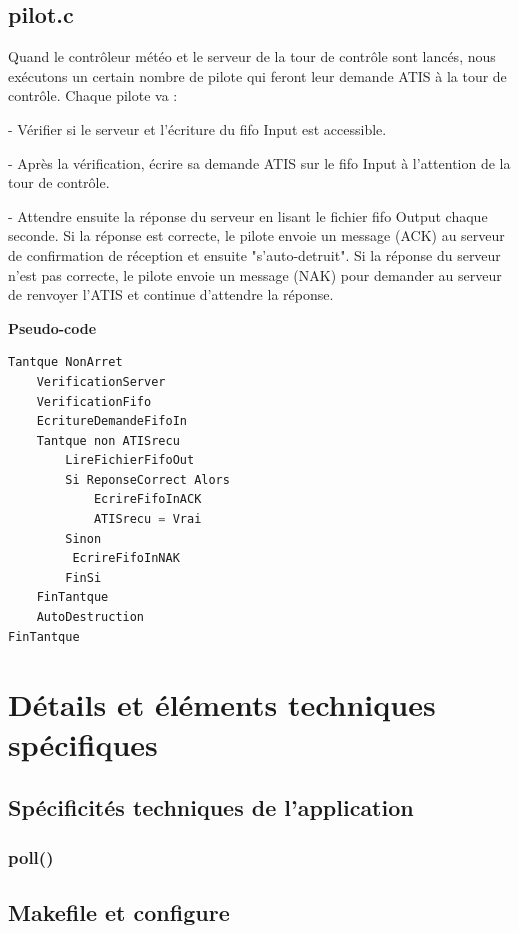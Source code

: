 \documentclass{report}
\begin{document}
{	\section{pilot.c}
		
 Quand le contrôleur météo et le serveur de la tour de contrôle sont lancés, nous exécutons un certain nombre de pilote qui feront leur demande ATIS à la tour de contrôle.
		Chaque pilote va : 
		
		- Vérifier si le serveur et l'écriture du fifo Input est accessible.
		
		- Après la vérification, écrire sa demande ATIS sur le fifo Input à l'attention de la tour de contrôle.
		
		- Attendre ensuite la réponse du serveur en lisant le fichier fifo Output chaque seconde. Si la réponse est correcte, le pilote envoie un message (ACK) au serveur de confirmation de réception et ensuite "s'auto-detruit".  Si la réponse du serveur n'est pas correcte, le pilote envoie un message (NAK) pour demander au serveur de renvoyer l'ATIS et continue d'attendre la réponse.
\newline

\textbf{Pseudo-code}

\begin{lstlisting}[language=C]
Tantque NonArret
	VerificationServer
	VerificationFifo
	EcritureDemandeFifoIn
	Tantque non ATISrecu
		LireFichierFifoOut
		Si ReponseCorrect Alors
			EcrireFifoInACK
			ATISrecu = Vrai 
		Sinon
		 EcrireFifoInNAK
		FinSi
	FinTantque
	AutoDestruction
FinTantque 
\end{lstlisting}

\chapter{Détails et éléments techniques spécifiques}

	\section{Spécificités techniques de l'application}

		\subsection{poll()}

	\section{Makefile et configure}

}
\end{document}
